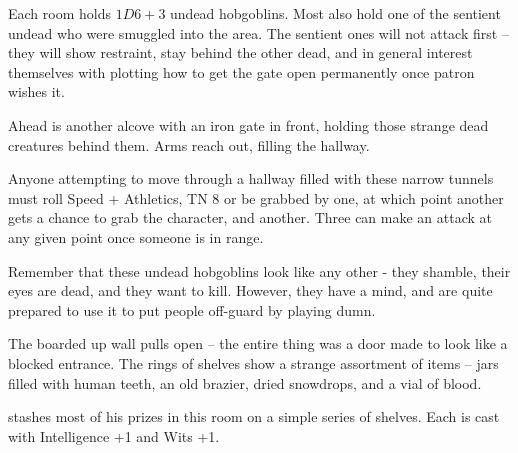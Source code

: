 \begin{multicols}{2}
Each room holds $1D6+3$ undead hobgoblins.  Most also hold one of the sentient undead who were smuggled into the area.  The sentient ones will not attack first -- they will show restraint, stay behind the other dead, and in general interest themselves with plotting how to get the gate open permanently once \gls{patron} wishes it.

\huntingdog



\begin{boxtext}
	Ahead is another alcove with an iron gate in front, holding those strange dead creatures behind them.  Arms reach out, filling the hallway.
\end{boxtext}

\undeadhobgoblin

Anyone attempting to move through a hallway filled with these narrow tunnels must roll Speed + Athletics, TN 8 or be grabbed by one, at which point another gets a chance to grab the character, and another.  Three can make an attack at any given point once someone is in range.


Remember that these undead hobgoblins look like any other - they shamble, their eyes are dead, and they want to kill.
However, they have a mind, and are quite prepared to use it to put people off-guard by playing dumn.

\sentientundeadhobgoblin


\begin{boxtext}

	The boarded up wall pulls open -- the entire thing was a door made to look like a blocked entrance.  The rings of shelves show a strange assortment of items -- jars filled with human teeth, an old brazier, dried snowdrops, and a vial of blood.

\end{boxtext}

 stashes most of his prizes in this room on a simple series of shelves.  Each is cast with Intelligence +1 and Wits +1.

\begin{enumerate}


\end{enumerate}
\end{multicols}
